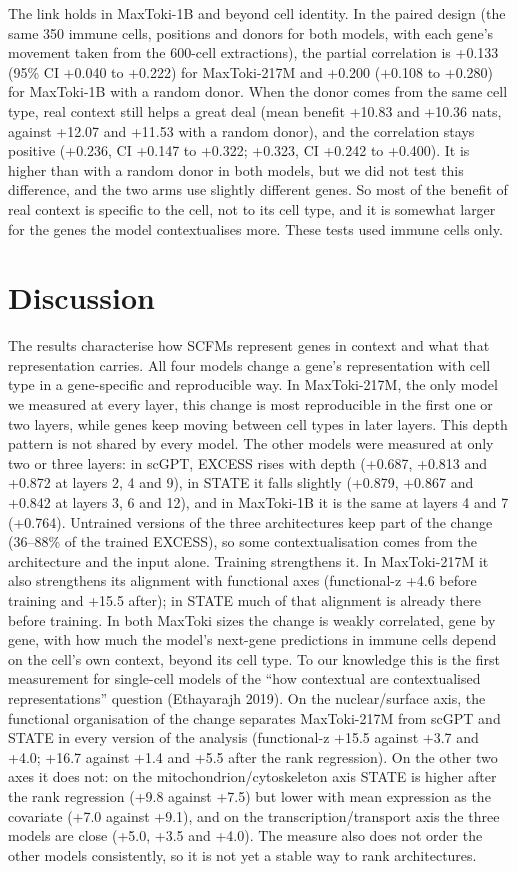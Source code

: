 \documentclass[
  11pt,
]{article}
\begin{document}
The link holds in MaxToki-1B and beyond cell identity. In the paired
design (the same 350 immune cells, positions and donors for both models,
with each gene's movement taken from the 600-cell extractions), the
partial correlation is +0.133 (95\% CI +0.040 to +0.222) for
MaxToki-217M and +0.200 (+0.108 to +0.280) for MaxToki-1B with a random
donor. When the donor comes from the same cell type, real context still
helps a great deal (mean benefit +10.83 and +10.36 nats, against +12.07
and +11.53 with a random donor), and the correlation stays positive
(+0.236, CI +0.147 to +0.322; +0.323, CI +0.242 to +0.400). It is higher
than with a random donor in both models, but we did not test this
difference, and the two arms use slightly different genes. So most of
the benefit of real context is specific to the cell, not to its cell
type, and it is somewhat larger for the genes the model contextualises
more. These tests used immune cells only.

\section{Discussion}\label{discussion}

The results characterise how SCFMs represent genes in context and what
that representation carries. All four models change a gene's
representation with cell type in a gene-specific and reproducible way.
In MaxToki-217M, the only model we measured at every layer, this change
is most reproducible in the first one or two layers, while genes keep
moving between cell types in later layers. This depth pattern is not
shared by every model. The other models were measured at only two or
three layers: in scGPT, EXCESS rises with depth (+0.687, +0.813 and
+0.872 at layers 2, 4 and 9), in STATE it falls slightly (+0.879, +0.867
and +0.842 at layers 3, 6 and 12), and in MaxToki-1B it is the same at
layers 4 and 7 (+0.764). Untrained versions of the three architectures
keep part of the change (36--88\% of the trained EXCESS), so some
contextualisation comes from the architecture and the input alone.
Training strengthens it. In MaxToki-217M it also strengthens its
alignment with functional axes (functional-z +4.6 before training and
+15.5 after); in STATE much of that alignment is already there before
training. In both MaxToki sizes the change is weakly correlated, gene by
gene, with how much the model's next-gene predictions in immune cells
depend on the cell's own context, beyond its cell type. To our knowledge
this is the first measurement for single-cell models of the ``how
contextual are contextualised representations'' question (Ethayarajh
2019). On the nuclear/surface axis, the functional organisation of the
change separates MaxToki-217M from scGPT and STATE in every version of
the analysis (functional-z +15.5 against +3.7 and +4.0; +16.7 against
+1.4 and +5.5 after the rank regression). On the other two axes it does
not: on the mitochondrion/cytoskeleton axis STATE is higher after the
rank regression (+9.8 against +7.5) but lower with mean expression as
the covariate (+7.0 against +9.1), and on the transcription/transport
axis the three models are close (+5.0, +3.5 and +4.0). The measure also
does not order the other models consistently, so it is not yet a stable
way to rank architectures.
\end{document}
